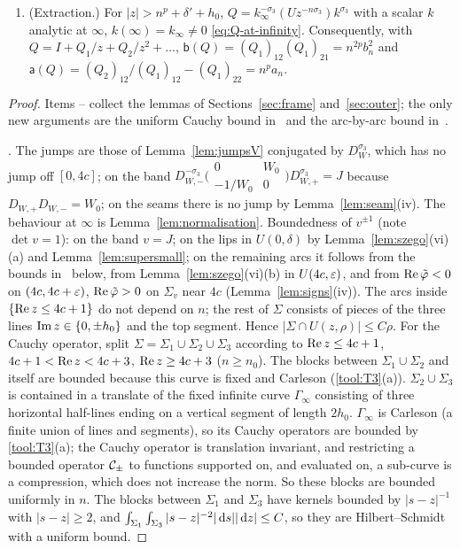 \begin{proposition}
\begin{enumerate}
  $\eta>0$, $|Q(z)|\le C_{n,\eta}(1+|z|^{-|\alpha|/2-\eta})$ for $z\notin\Sigma$.
\item[\Fi8] (Extraction.) For $|z|>n^p+\delta'+h_0$, $Q=k_\infty^{-\sigma_3}(Uz^{-n\sigma_3})k^{\sigma_3}$ with a scalar $k$ analytic
  at $\infty$, $k(\infty)=k_\infty\ne0$ \eqref{eq:Q-at-infinity}. Consequently, with $Q=I+Q_1/z+Q_2/z^2+\dots$,
  $\mathsf b(Q)=(Q_1)_{12}(Q_1)_{21}=n^{2p}b_n^2$ and $\mathsf a(Q)=(Q_2)_{12}/(Q_1)_{12}-(Q_1)_{22}=n^pa_n$.
\end{enumerate}
\end{proposition}

\begin{proof}
Items -- collect the lemmas of Sections~\ref{sec:frame} and~\ref{sec:outer}; the only new arguments are the uniform
Cauchy bound in~ and the arc-by-arc bound in~.

. The jumps are those of Lemma~\ref{lem:jumpsV} conjugated by $D_W^{\sigma_3}$, which has no jump off $[0,4c]$; on the band
$D_{W,-}^{-\sigma_3}\bigl(\begin{smallmatrix}0&W_0\\-1/W_0&0\end{smallmatrix}\bigr)D_{W,+}^{\sigma_3}=J$ because $D_{W,+}D_{W,-}=W_0$;
on the seams there is no jump by Lemma~\ref{lem:seam}(iv). The behaviour at $\infty$ is Lemma~\ref{lem:normalisation}.
Boundedness of $v^{\pm1}$ (note $\det v=1$): on the band $v=J$; on the lips in $U(0,\delta)$ by Lemma~\ref{lem:szego}(vi)(a)
and Lemma~\ref{lem:supersmall}; on the remaining arcs it follows from the bounds in~ below, from
Lemma~\ref{lem:szego}(vi)(b) in $U(4c,\varepsilon)$, and from $\operatorname{Re}\tilde\varphi<0$ on $(4c,4c+\varepsilon)$, $\operatorname{Re}\tilde\varphi>0$ on $\Sigma_v$ near
$4c$ (Lemma~\ref{lem:signs}(iv)). The arcs inside $\{\operatorname{Re} z\le4c+1\}$ do not depend on $n$; the rest of $\Sigma$ consists of
pieces of the three lines $\operatorname{Im} z\in\{0,\pm h_0\}$ and the top segment. Hence $|\Sigma\cap U(z,\rho)|\le C\rho$. For the
Cauchy operator, split $\Sigma=\Sigma_1\cup\Sigma_2\cup\Sigma_3$ according to $\operatorname{Re} z\le4c+1$, $4c+1<\operatorname{Re} z<4c+3$, $\operatorname{Re} z\ge4c+3$
($n\ge n_0$). The blocks between $\Sigma_1\cup\Sigma_2$ and itself are bounded because this curve is fixed and Carleson
(\ref{tool:T3}(a)). $\Sigma_2\cup\Sigma_3$ is contained in a translate of the fixed infinite curve $\Gamma_\infty$ consisting
of three horizontal half-lines ending on a vertical segment of length $2h_0$. $\Gamma_\infty$ is Carleson (a finite union of
lines and segments), so its Cauchy operators are bounded by \ref{tool:T3}(a); the Cauchy operator is translation invariant,
and restricting a bounded operator $\mathcal{C}_\pm$ to functions supported on, and evaluated on, a sub-curve is a compression,
which does not increase the norm. So these blocks are bounded uniformly in $n$. The blocks between $\Sigma_1$ and
$\Sigma_3$ have kernels bounded by $|s-z|^{-1}$ with $|s-z|\ge2$, and $\int_{\Sigma_1}\int_{\Sigma_3}|s-z|^{-2}|\,\mathrm{d} s||\,\mathrm{d} z|\le C$,
so they are Hilbert--Schmidt with a uniform bound.


\end{proof}
